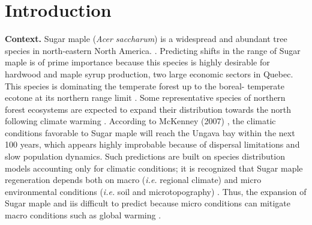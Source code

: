 


\newpage
\setcounter{page}{1}

\section{Introduction}

\textbf{Context.} Sugar maple (\textit{Acer saccharum}) is a widespread and
abundant tree species in north-eastern North America.
\cite{Graignic2013,Messaoud2007,Kellman2004,Barras1998}. Predicting shifts in
the range of Sugar maple is of prime importance because this species is highly
desirable for hardwood and maple syrup production, two large economic sectors
in Quebec. This species is dominating the temperate forest up to the boreal-
temperate ecotone at its northern range limit \cite{Barras1998}. Some
representative species of northern forest ecosystems are expected to expand
their distribution towards the north following climate warming
\cite{Sciences2014,Iverson2002}. According to McKenney (2007)
\cite{Sciences2014}, the climatic conditions  favorable to Sugar maple  will
reach the Ungava bay within the next 100 years, which appears highly
improbable because of dispersal limitations and slow population dynamics.
Such predictions are built on species distribution models accounting only for
climatic conditions; it is recognized that Sugar maple regeneration depends
both on macro  (\textit{i.e.} regional climate) and micro environmental
conditions (\textit{i.e.} soil and microtopography)
\cite{Graignic2013,Lafleur2010}. Thus, the expansion of Sugar maple and iis
difficult to predict because micro conditions can mitigate macro conditions
such as global warming \cite{DeFrenne2013}.\\ 

